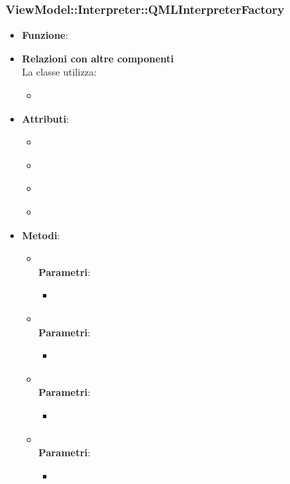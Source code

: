 \subsubsection{ViewModel::Interpreter::QMLInterpreterFactory}
\begin{itemize}
\item\textbf{Funzione}:
\item\textbf{Relazioni con altre componenti}\\
La classe utilizza:
	\begin{itemize}
		\item
	\end{itemize}
\item\textbf{Attributi}:
	\begin{itemize}
		\item\code{}\\
		\item\code{}\\
		\item\code{}\\
		\item\code{}\\
	\end{itemize}
\item\textbf{Metodi}:
	\begin{itemize}
		\item\code{}\\
		\textbf{Parametri}:
			\begin{itemize}
				\item\code{}\\
			\end{itemize}
		\item\code{}\\
		\textbf{Parametri}:
			\begin{itemize}
				\item\code{}\\
			\end{itemize}
		\item\code{}\\
		\textbf{Parametri}:
			\begin{itemize}
				\item\code{}\\
			\end{itemize}
		\item\code{}\\
		\textbf{Parametri}:
			\begin{itemize}
				\item\code{}\\
			\end{itemize}
	\end{itemize}
\end{itemize}

